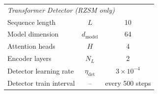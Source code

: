 \documentclass[conference]{IEEEtran}
\begin{document}
\begin{table}[h]
\begin{tabular}{lcc}
\hline
\multicolumn{3}{l}{\textit{Transformer Detector (RZSM only)}} \\
Sequence length & $L$ & 10 \\
Model dimension & $d_{\mathrm{model}}$ & 64 \\
Attention heads & $H$ & 4 \\
Encoder layers & $N_L$ & 2 \\
Detector learning rate & $\eta_{\mathrm{det}}$ & $3 \times 10^{-4}$ \\
Detector train interval & -- & every 500 steps \\
\hline
\end{tabular}
\end{table}



\end{document}
